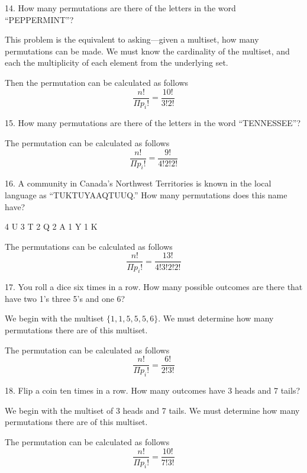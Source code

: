 \documentclass{hippoidC}
\begin{document}
\begin{prooflist}{14. How many permutations are there of the letters in the word “PEPPERMINT”?}
	\item This problem is the equivalent to asking---given a multiset, how many
	permutations can be made.  We must know the cardinality of the multiset, and each
	the multiplicity of each element from the underlying set.
	\item Then the permutation can be calculated as follows
	$$ \dfrac{n!}{\Pi{p_i}!} = \dfrac{10!}{3!2!}$$
\end{prooflist}

\begin{prooflist}{15. How many permutations are there of the letters in the word “TENNESSEE”?}
	\item The permutation can be calculated as follows
	$$ \dfrac{n!}{\Pi{p_i}!} = \dfrac{9!}{4!2!2!}$$
\end{prooflist}

\begin{prooflist}{16. A community in Canada’s Northwest Territories is known in the local language as “TUKTUYAAQTUUQ.” How many permutations does this name have?}
	\item
	4 U
	3 T
	2 Q
	2 A
	1 Y
	1 K
	\item The permutations can be calculated as follows
	$$ \dfrac{n!}{\Pi{p_i}!} = \dfrac{13!}{4!3!2!2!}$$
\end{prooflist}

\begin{prooflist}{17. You roll a dice six times in a row. How many possible outcomes are there that have two 1’s three 5’s and one 6?}
	\item We begin with the multiset $\{1, 1, 5, 5, 5, 6\}$. We must determine how
	many permutations there are of this multiset.
	\item The permutation can be calculated as follows
	$$ \dfrac{n!}{\Pi{p_i}!} = \dfrac{6!}{2!3!}$$
\end{prooflist}

\begin{prooflist}{18. Flip a coin ten times in a row. How many outcomes have 3 heads and 7 tails?}
	\item We begin with the multiset of 3 heads and 7 tails. We must determine how
	many permutations there are of this multiset.
	\item The permutation can be calculated as follows
	$$ \dfrac{n!}{\Pi{p_i}!} = \dfrac{10!}{7!3!}$$
\end{prooflist}
\end{document}
